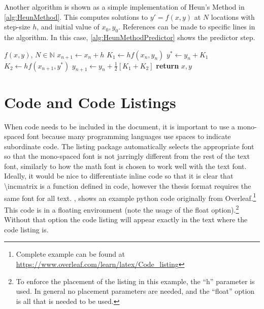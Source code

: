     Another algorithm is shown as a simple implementation of Heun's Method in \cref{alg:HeunMethod}.
    This computes solutions to $y'=f\left(x,y\right)$ at $N$ locations with step-size $h$, and initial value of $x_0, y_0$.
    References can be made to specific lines in the algorithm.
    In this case, \cref{alg:HeunMethodPredictor} shows the predictor step.
    \begin{algorithm}
        \begin{algorithmic}
            \Require $f\left(x,y\right)$, $N\in\mathbb{N}$
                    \State $x_{n+1}\gets x_n+h$
                    \State $K_1\gets hf\left(x_n, y_n\right)$
                    \State $y^*\gets y_n+K_1$ \label{alg:HeunMethodPredictor}
                    \State $K_2\gets hf\left(x_{n+1}, y^*\right)$
                    \State $y_{n+1}\gets y_n+\frac{1}{2}\left[K_1+K_2\right]$
                \EndFor
                \State \textbf{return} $x,y$ 
            \EndProcedure
        \end{algorithmic}
        \caption{Heun's Method for given step-size.}
        \label{alg:HeunMethod}
    \end{algorithm}

\section{Code and Code Listings} \label{sec:CodeAndCodeListings}
    When code needs to be included in the document, it is important to use a mono-spaced font because many programming languages use spaces to indicate subordinate code.
    The listing package automatically selects the appropriate font so that the mono-spaced font is not jarringly different from the rest of the text font, similarly to how the math font is chosen to work well with the text font.
    Ideally, it would be nice to differentiate inline code so that it is clear that \textbackslash incmatrix is a function defined in code, however the thesis format requires the same font for all text.
    , shows an example python code originally from Overleaf.\footnote{Complete example can be found at \url{https://www.overleaf.com/learn/latex/Code_listing}}
    This code is in a floating environment (note the usage of the float option).\footnote{To enforce the placement of the listing in this example, the ``h'' parameter is used. In general no placement parameters are needed, and the ``float'' option is all that is needed to be used.}
    Without that option the code listing will appear exactly in the text where the code listing is.

